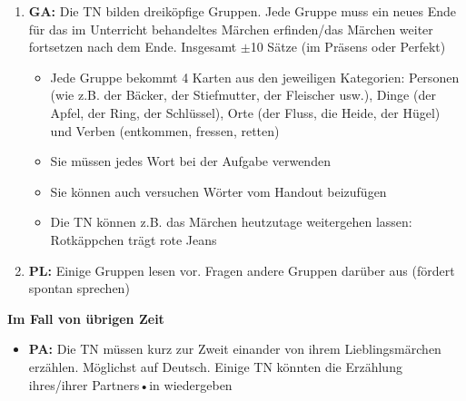 \documentclass[12pt,a4paper]{article}
\begin{document}
\begin{enumerate}
    \item \textbf{GA:} Die TN bilden dreiköpfige Gruppen. Jede Gruppe muss ein neues Ende für das im Unterricht behandeltes Märchen erfinden/das Märchen weiter fortsetzen nach dem Ende. Insgesamt $\pm$10 Sätze (im Präsens oder Perfekt)
    \begin{itemize}
        \item Jede Gruppe bekommt 4 Karten aus den jeweiligen Kategorien: Personen (wie z.B. der Bäcker, der Stiefmutter, der Fleischer usw.), Dinge (der Apfel, der Ring, der Schlüssel), Orte (der Fluss, die Heide, der Hügel) und Verben (entkommen, fressen, retten)
        \item Sie müssen jedes Wort bei der Aufgabe verwenden
        \item Sie können auch versuchen Wörter vom Handout beizufügen
    \end{itemize}

        \begin{itemize}
            \item Die TN können z.B. das Märchen heutzutage weitergehen lassen: Rotkäppchen trägt rote Jeans
        \end{itemize}

    \item \textbf{PL:} Einige Gruppen lesen vor. Fragen andere Gruppen darüber aus (fördert spontan sprechen)

\end{enumerate}

\large{\textbf{Im Fall von übrigen Zeit}}
\begin{itemize}
    
    \item \textbf{PA:} Die TN müssen kurz zur Zweit einander von ihrem Lieblingsmärchen erzählen. Möglichst auf Deutsch. Einige TN könnten die Erzählung ihres/ihrer Partners•in wiedergeben

\end{itemize}
\end{document}
